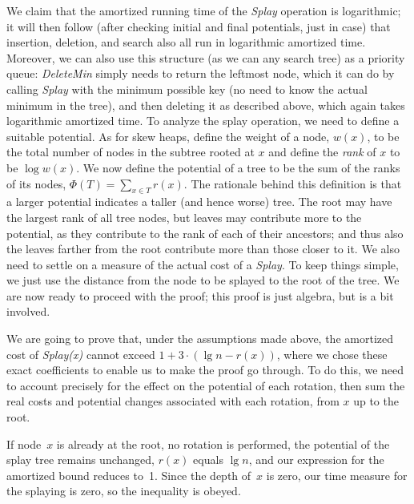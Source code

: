 \documentclass[11pt]{article}
\begin{document}
We claim that the amortized running time of the \emph{Splay} operation
is logarithmic; it will then follow (after checking initial and final
potentials, just in case) that insertion, deletion, and search also all
run in logarithmic amortized time.  Moreover, we can also use this
structure (as we can any search tree) as a priority queue: \emph{DeleteMin}
simply needs to return the leftmost node, which it can do by calling
\emph{Splay} with the minimum possible key (no need to know the actual minimum
in the tree), and then deleting it as described above, which again takes
logarithmic amortized time.
To analyze the splay operation, we need to define a suitable potential.
As for skew heaps, define the weight of a node, $w(x)$, to be the total
number of nodes in the subtree rooted at $x$ and define the \emph{rank} of $x$
to be $\log w(x)$.  We now define the potential of a tree to be the sum
of the ranks of its nodes, $\Phi(T) = \sum_{x\in T} r(x)$.
The rationale behind this definition is that a larger potential indicates
a taller (and hence worse) tree.  The root may have the largest rank of all
tree nodes, but leaves may contribute more to the potential, as they
contribute to the rank of each of their ancestors; and thus also the leaves
farther from the root contribute more than those closer to it.
We also need to settle on a measure of the actual cost of a \emph{Splay}.
To keep things simple, we just use the distance from the node to be splayed
to the root of the tree.
We are now ready to proceed with the proof; this proof is just algebra,
but is a bit involved.

We are going to prove that, under the assumptions made above, the amortized
cost of \emph{Splay(x)} cannot exceed $1+3\cdot(\lg n-r(x))$, where we chose
these exact coefficients to enable us to make the proof go through.
To do this, we need to account precisely for the effect on the
potential of each rotation, then sum the real costs and potential changes
associated with each rotation, from $x$ up to the root.

If node~$x$ is already at the root, no rotation is performed, the potential of
the splay tree remains unchanged, $r(x)$ equals $\lg n$, and our expression
for the amortized bound reduces to~1.  Since the depth of~$x$ is zero,
our time measure for the splaying is zero, so the inequality is obeyed.
\end{document}
